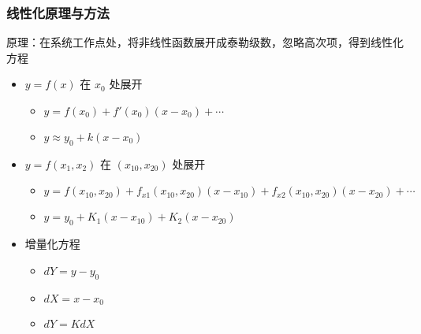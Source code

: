 \documentclass{article}
\begin{document}
\begin{frame}
\frametitle{线性化原理与方法}
\label{sec-1-1-3}

原理：在系统工作点处，将非线性函数展开成泰勒级数，忽略高次项，得到线性化方程
\begin{itemize}
\item <2->$y=f(x)$ 在 $x_0$ 处展开
\begin{itemize}
\item <3->$y =f(x_0)+f'(x_0)(x-x_0)+\cdots$
\item <3->$y \approx   y_0 + k(x-x_0)$
\end{itemize}
\item <4->$y=f(x_1,x_2)$ 在 $(x_{10},x_{20})$ 处展开
\begin{itemize}
\item <5->$y = f(x_{10},x_{20})+f_{x1}(x_{10},x_{20})(x-x_{10})+f_{x2}(x_{10},x_{20})(x-x_{20})+\cdots$
\item <5->$y = y_0+K_1(x-x_{10})+K_2(x-x_{20})$
\end{itemize}
\item <6-> 增量化方程
\begin{itemize}
\item <7-> $dY=y-y_0$
\item <7-> $dX=x-x_0$
\item <8-> $dY=K dX$
\end{itemize}
\end{itemize}
\end{frame}
\end{document}

